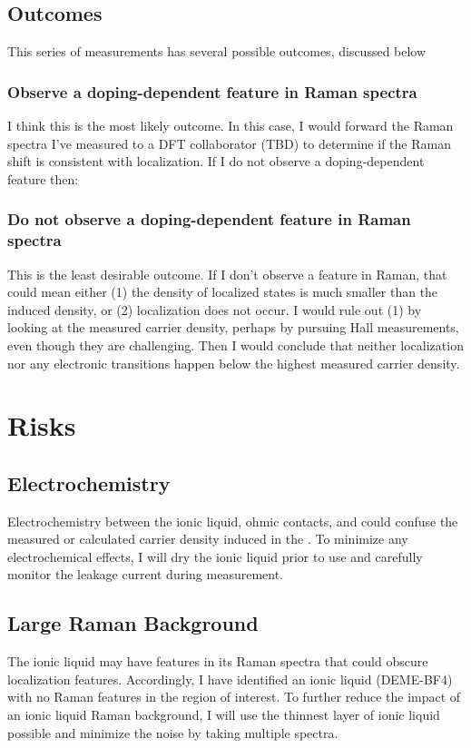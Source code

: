 \documentclass[11pt]{article}
\begin{document}
\begin{multicols}{2}
\subsection{Outcomes}

This series of measurements has several possible outcomes, discussed below

\subsubsection{Observe a doping-dependent feature in Raman spectra}
I think this is the most likely outcome. In this case, I would forward the Raman spectra I've measured to a DFT collaborator (TBD) to determine if the Raman shift is consistent with localization. If I do not observe a doping-dependent feature then:

\subsubsection{Do not observe a doping-dependent feature in Raman spectra}
This is the least desirable outcome. If I don't observe a feature in Raman, that could mean either (1) the density of localized states is much smaller than the induced density, or (2) localization does not occur. I would rule out (1) by looking at the measured carrier density, perhaps by pursuing Hall measurements, even though they are challenging. Then I would conclude that neither localization nor any electronic transitions happen below the highest measured carrier density.

\section{Risks}

\subsection{Electrochemistry}
Electrochemistry between the ionic liquid, ohmic contacts, and \rucl could confuse the measured or calculated carrier density induced in the \ruclnospace. To minimize any electrochemical effects, I will dry the ionic liquid prior to use and carefully monitor the leakage current during measurement.

\subsection{Large Raman Background}
The ionic liquid may have features in its Raman spectra that could obscure localization features. Accordingly, I have identified an ionic liquid (DEME-BF4) with no Raman features in the region of interest. To further reduce the impact of an ionic liquid Raman background, I will use the thinnest layer of ionic liquid possible and minimize the noise by taking multiple spectra.


\end{multicols}
\end{document}
